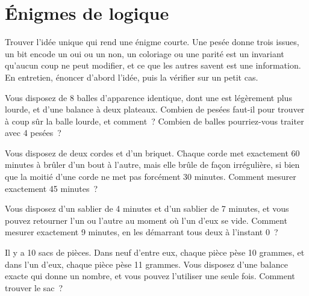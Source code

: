 \chapter{Énigmes de logique}\label{ch:iv1:logic-riddles}

\begin{ivtrains}
Trouver l'idée unique qui rend une énigme courte. Une pesée donne trois issues, un bit encode un oui ou un non, un coloriage ou une parité est un invariant qu'aucun coup ne peut modifier, et ce que les autres savent est une information. En entretien, énoncer d'abord l'idée, puis la vérifier sur un petit cas.
\end{ivtrains}

\begin{question}\label{iq:iv1:logic-riddles:1}
Vous disposez de 8 balles d'apparence identique, dont une est légèrement plus lourde, et d'une balance à deux plateaux. Combien de pesées faut-il pour trouver à coup sûr la balle lourde, et comment~? Combien de balles pourriez-vous traiter avec 4 pesées~?
\end{question}

\begin{question}\label{iq:iv1:logic-riddles:2}
Vous disposez de deux cordes et d'un briquet. Chaque corde met exactement 60 minutes à brûler d'un bout à l'autre, mais elle brûle de façon irrégulière, si bien que la moitié d'une corde ne met pas forcément 30 minutes. Comment mesurer exactement 45 minutes~?
\end{question}

\begin{question}\label{iq:iv1:logic-riddles:3}
Vous disposez d'un sablier de 4 minutes et d'un sablier de 7 minutes, et vous pouvez retourner l'un ou l'autre au moment où l'un d'eux se vide. Comment mesurer exactement 9 minutes, en les démarrant tous deux à l'instant 0~?
\end{question}

\begin{question}\label{iq:iv1:logic-riddles:4}
Il y a 10 sacs de pièces. Dans neuf d'entre eux, chaque pièce pèse 10 grammes, et dans l'un d'eux, chaque pièce pèse 11 grammes. Vous disposez d'une balance exacte qui donne un nombre, et vous pouvez l'utiliser une seule fois. Comment trouver le sac~?
\end{question}

